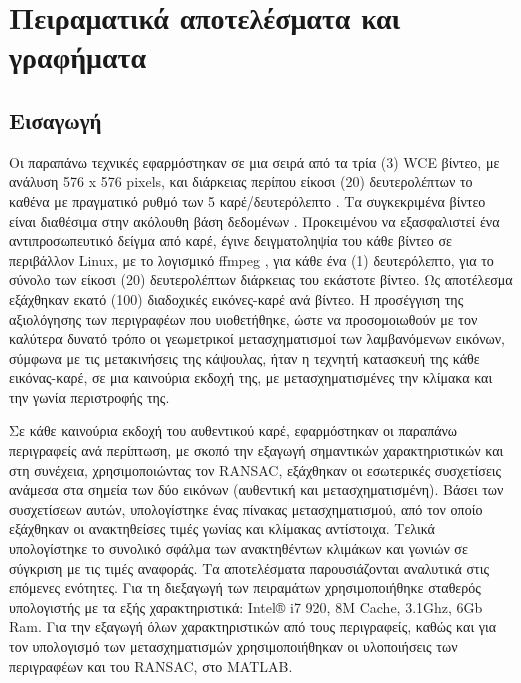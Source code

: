  
 
 
 
 \section{Πειραματικά αποτελέσματα και γραφήματα}

 \subsection{Εισαγωγή}
 
 Οι παραπάνω τεχνικές εφαρμόστηκαν σε μια σειρά από τα τρία (3)  WCE βίντεο, 
με ανάλυση 576 x 576 pixels, και διάρκειας περίπου είκοσι (20) δευτερολέπτων
το καθένα με πραγματικό ρυθμό των 5 καρέ/δευτερόλεπτο . Τα συγκεκριμένα βίντεο είναι διαθέσιμα
στην ακόλουθη βάση δεδομένων \cite{atlas2012}. 
  Προκειμένου να εξασφαλιστεί ένα αντιπροσωπευτικό δείγμα από καρέ, έγινε δειγματοληψία του κάθε βίντεο 
  σε περιβάλλον Linux, με το λογισμικό ffmpeg\cite{ffmpeg} , για κάθε ένα (1) δευτερόλεπτο,
  για το σύνολο των είκοσι (20) δευτερολέπτων διάρκειας του εκάστοτε βίντεο.
  Ως αποτέλεσμα εξάχθηκαν εκατό (100) διαδοχικές εικόνες-καρέ ανά βίντεο. 
  Η προσέγγιση της αξιολόγησης των περιγραφέων που υιοθετήθηκε, ώστε να προσομοιωθούν 
  με τον καλύτερα δυνατό τρόπο οι γεωμετρικοί μετασχηματισμοί των λαμβανόμενων εικόνων, 
  σύμφωνα με τις μετακινήσεις της κάψουλας, ήταν η τεχνητή κατασκευή της κάθε εικόνας-καρέ,
  σε μια καινούρια εκδοχή της, με μετασχηματισμένες την κλίμακα και την γωνία περιστροφής της.\par
  Σε κάθε καινούρια εκδοχή του αυθεντικού καρέ, εφαρμόστηκαν οι παραπάνω περιγραφείς ανά περίπτωση,
  με σκοπό την εξαγωγή σημαντικών χαρακτηριστικών και στη συνέχεια, χρησιμοποιώντας τον RANSAC, εξάχθηκαν
  οι εσωτερικές συσχετίσεις ανάμεσα στα σημεία των δύο εικόνων (αυθεντική και μετασχηματισμένη). Βάσει των συσχετίσεων αυτών,
  υπολογίστηκε ένας πίνακας μετασχηματισμού, από τον οποίο εξάχθηκαν οι ανακτηθείσες τιμές γωνίας και κλίμακας αντίστοιχα.
Τελικά υπολογίστηκε το συνολικό σφάλμα των ανακτηθέντων κλιμάκων και γωνιών σε σύγκριση με τις τιμές αναφοράς. 
Τα αποτελέσματα παρουσιάζονται αναλυτικά στις επόμενες ενότητες. Για τη διεξαγωγή των πειραμάτων χρησιμοποιήθηκε σταθερός
υπολογιστής με τα εξής χαρακτηριστικά: Intel® i7 920, 8M Cache, 3.1Ghz, 6Gb Ram.
Για την εξαγωγή όλων χαρακτηριστικών από τους περιγραφείς, καθώς και για τον υπολογισμό των μετασχηματισμών
 χρησιμοποιήθηκαν οι υλοποιήσεις των περιγραφέων και του RANSAC, στο ΜATLAB. \cite{matlab}

